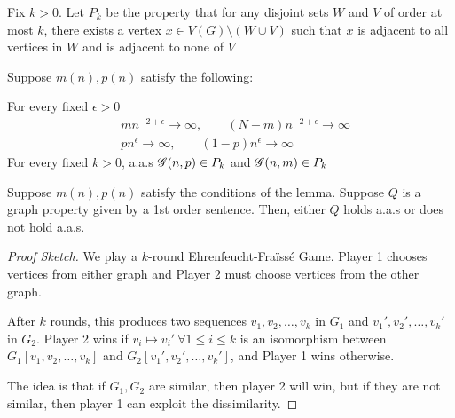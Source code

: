 Fix $k > 0$.
Let $P_k$ be the property that for any disjoint sets $W$ and $V$ of order at most $k$, there exists a vertex $x \in V(G) \setminus (W \cup V)$ such that $x$ is adjacent to all vertices in $W$ and is adjacent to none of $V$

\begin{lemma}
    Suppose $m(n), p(n)$ satisfy the following:

    For every fixed $\epsilon > 0$
    \begin{align*}
        &mn^{-2 + \epsilon} \rightarrow \infty, \qquad (N - m)n^{-2 + \epsilon} \rightarrow \infty \\
        &pn^\epsilon \rightarrow \infty, \qquad (1-p)n^\epsilon \rightarrow \infty
    \end{align*}
    For every fixed $k > 0$, a.a.s $\operatorname{\mathscr{G}}(n, p) \in P_k$ and $\operatorname{\mathscr{G}}(n, m) \in P_k$
\end{lemma}

\begin{theorem}
    Suppose $m(n), p(n)$ satisfy the conditions of the lemma.
    Suppose $Q$ is a graph property given by a 1st order sentence.
    Then, either $Q$ holds a.a.s or does not hold a.a.s.
\end{theorem}
\begin{proof}[Proof Sketch]
    We play a $k$-round Ehrenfeucht-Fra\"{i}ss\'{e} Game.
    Player 1 chooses vertices from either graph and Player 2 must choose vertices from the other graph.
    
    After $k$ rounds, this produces two sequences $v_1, v_2, \ldots, v_k$ in $G_1$ and $v_1', v_2', \ldots, v_k'$ in $G_2$.
    Player 2 wins if $v_i \mapsto v_i' \ \forall 1 \leq i \leq k$ is an isomorphism between $G_1[v_1, v_2, \ldots, v_k]$ and $G_2[v_1', v_2', \ldots, v_k']$, and Player 1 wins otherwise.

    The idea is that if $G_1, G_2$ are similar, then player 2 will win, but if they are not similar, then player 1 can exploit the dissimilarity.  
\end{proof}